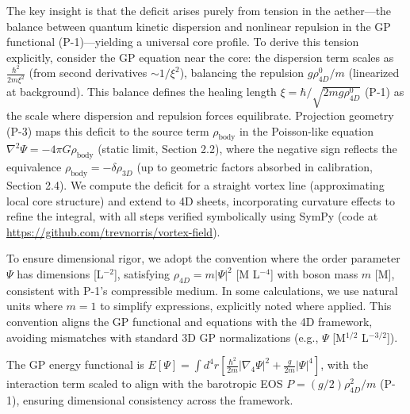 The key insight is that the deficit arises purely from tension in the aether---the balance between quantum kinetic dispersion and nonlinear repulsion in the GP functional (P-1)---yielding a universal core profile. To derive this tension explicitly, consider the GP equation near the core: the dispersion term scales as $\frac{\hbar^2}{2 m \xi^2}$ (from second derivatives $\sim 1/\xi^2$), balancing the repulsion $g \rho_{4D}^0 / m$ (linearized at background). This balance defines the healing length $\xi = \hbar / \sqrt{2 m g \rho_{4D}^0}$ (P-1) as the scale where dispersion and repulsion forces equilibrate. Projection geometry (P-3) maps this deficit to the source term $\rho_{\text{body}}$ in the Poisson-like equation $\nabla^2 \Psi = -4\pi G \rho_{\text{body}}$ (static limit, Section 2.2), where the negative sign reflects the equivalence $\rho_{\text{body}} = - \delta \rho_{3D}$ (up to geometric factors absorbed in calibration, Section 2.4). We compute the deficit for a straight vortex line (approximating local core structure) and extend to 4D sheets, incorporating curvature effects to refine the integral, with all steps verified symbolically using SymPy (code at \url{https://github.com/trevnorris/vortex-field}).

To ensure dimensional rigor, we adopt the convention where the order parameter $\Psi$ has dimensions [L$^{-2}$], satisfying $\rho_{4D} = m |\Psi|^2$ [M L$^{-4}$] with boson mass $m$ [M], consistent with P-1's compressible medium. In some calculations, we use natural units where $m=1$ to simplify expressions, explicitly noted where applied. This convention aligns the GP functional and equations with the 4D framework, avoiding mismatches with standard 3D GP normalizations (e.g., $\Psi$ [M$^{1/2}$ L$^{-3/2}$]).

The GP energy functional is $E[\Psi] = \int d^4 r \left[ \frac{\hbar^2}{2 m} |\nabla_4 \Psi|^2 + \frac{g}{2m} |\Psi|^4 \right]$, with the interaction term scaled to align with the barotropic EOS $P = (g/2) \rho_{4D}^2 / m$ (P-1), ensuring dimensional consistency across the framework.

